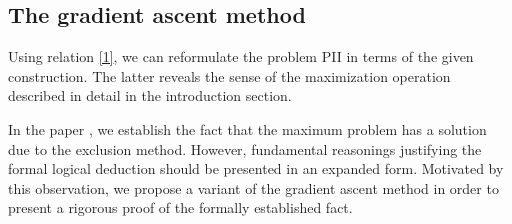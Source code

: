 \documentclass[a4paper,twoside,12pt]{article}
\begin{document}
\subsection{The  gradient  ascent method}
  Using relation \eqref{1},  we can reformulate the  problem PII in   terms of the given construction. The latter reveals the sense of the maximization operation described in detail  in the introduction section.


 In the paper \cite{KABaChu26}, we establish the fact that the maximum problem has a solution due to the exclusion method. However,   fundamental reasonings  justifying the formal logical deduction should be presented in an expanded form. Motivated by this observation, we propose a variant of the gradient ascent method in order to present a rigorous proof of the formally established   fact.
\end{document}
